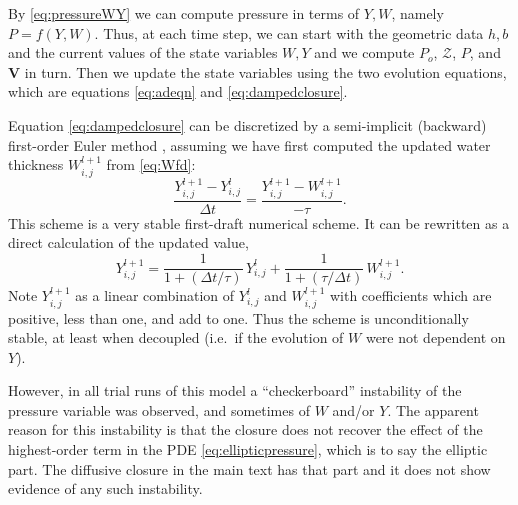\documentclass[11pt,final]{amsart}%
\newcommand\bV{\mathbf{V}}
\begin{document}
By \eqref{eq:pressureWY} we can compute pressure in terms of $Y,W$, namely $P = f(Y,W)$.   Thus, at each time step, we can start with the geometric data $h,b$ and the current values of the state variables $W,Y$ and we compute $P_o$, $\mathcal{Z}$, $P$, and $\bV$ in turn.  Then we update the state variables using the two evolution equations, which are equations \eqref{eq:adeqn} and \eqref{eq:dampedclosure}.

Equation \eqref{eq:dampedclosure} can be discretized by a semi-implicit (backward) first-order Euler method \citep{BurdenFaires}, assuming we have first computed the updated water thickness $W_{i,j}^{l+1}$ from \eqref{eq:Wfd}:
\begin{equation}
\frac{Y_{i,j}^{l+1} - Y_{i,j}^{l}}{\Delta t} = \frac{Y_{i,j}^{l+1} - W_{i,j}^{l+1}}{- \tau}. \label{eq:Yfd}
\end{equation}
This scheme is a very stable first-draft numerical scheme.  It can be rewritten as a direct calculation of the updated value,
   $$Y_{i,j}^{l+1} = \frac{1}{1 + (\Delta t/\tau)}\, Y_{i,j}^{l} + \frac{1}{1 + (\tau / \Delta t)}\, W_{i,j}^{l+1}.$$
Note $Y_{i,j}^{l+1}$ as a linear combination of $Y_{i,j}^{l}$ and $W_{i,j}^{l+1}$ with coefficients which are positive, less than one, and add to one.  Thus the scheme is unconditionally stable, at least when decoupled (i.e.~if the evolution of $W$ were not dependent on $Y$).

However, in all trial runs of this model a ``checkerboard'' instability of the pressure variable was observed, and sometimes of $W$ and/or $Y$.  The apparent reason for this instability is that the closure does not recover the effect of the highest-order term in the PDE \eqref{eq:ellipticpressure}, which is to say the elliptic part.  The diffusive closure in the main text has that part and it does not show evidence of any such instability.
\end{document}
